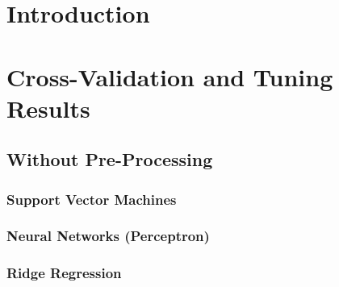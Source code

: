 \documentclass[twoside]{scrartcl}
\begin{document}
\section{Introduction}
\section{Cross-Validation and Tuning Results}
\subsection{Without Pre-Processing}
\subsubsection{Support Vector Machines}

\subsubsection{Neural Networks (Perceptron)}

\subsubsection{Ridge Regression}

\end{document}
